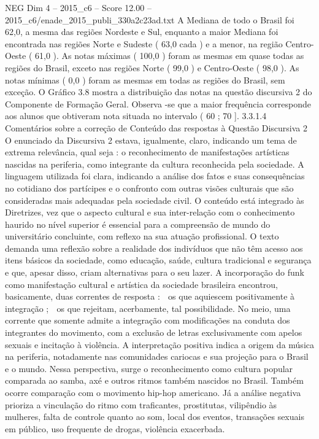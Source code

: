 \begin{textsample}{NEG Dim 4 – 2015\_c6 – Score 12.00 – 2015\_c6/enade\_2015\_publi\_330a2c23ad.txt}
A Mediana de todo o Brasil foi 62,0, a mesma das regiões Nordeste e Sul, enquanto a maior Mediana foi encontrada nas regiões Norte e Sudeste ( 63,0 cada ) e a menor, na região Centro-Oeste ( 61,0 ).
As notas máximas ( 100,0 ) foram as mesmas em quase todas as regiões do Brasil, exceto nas regiões Norte ( 99,0 ) e Centro-Oeste ( 98,0 ).
As notas mínimas ( 0,0 ) foram as mesmas em todas as regiões do Brasil, sem exceção.
O Gráfico 3.8 mostra a distribuição das notas na questão discursiva 2 do Componente de Formação Geral.
Observa -se que a maior frequência corresponde aos alunos que obtiveram nota situada no intervalo ( 60 ; 70 ]. 3.3.1.4 Comentários sobre a correção de Conteúdo das respostas à Questão Discursiva 2 O enunciado da Discursiva 2 estava, igualmente, claro, indicando um tema de extrema relevância, qual seja : o reconhecimento de manifestações artísticas nascidas na periferia, como integrante da cultura reconhecida pela sociedade.
A linguagem utilizada foi clara, indicando a análise dos fatos e suas consequências no cotidiano dos partícipes e o confronto com outras visões culturais que são consideradas mais adequadas pela sociedade civil.
O conteúdo está integrado às Diretrizes, vez que o aspecto cultural e sua inter-relação com o conhecimento haurido no nível superior é essencial para a compreensão de mundo do universitário concluinte, com reflexo na sua atuação profissional.
O texto demanda uma reflexão sobre a realidade dos indivíduos que não têm acesso aos itens básicos da sociedade, como educação, saúde, cultura tradicional e segurança e que, apesar disso, criam alternativas para o seu lazer.
A incorporação do funk como manifestação cultural e artística da sociedade brasileira encontrou, basicamente, duas correntes de resposta :  os que aquiescem positivamente à integração ;  os que rejeitam, acerbamente, tal possibilidade.
No meio, uma corrente que somente admite a integração com modificações na conduta dos integrantes do movimento, com a exclusão de letras exclusivamente com apelos sexuais e incitação à violência.
A interpretação positiva indica a origem da música na periferia, notadamente nas comunidades cariocas e sua projeção para o Brasil e o mundo.
Nessa perspectiva, surge o reconhecimento como cultura popular comparada ao samba, axé e outros ritmos também nascidos no Brasil.
Também ocorre comparação com o movimento hip-hop americano.
Já a análise negativa prioriza a vinculação do ritmo com traficantes, prostitutas, vilipêndio às mulheres, falta de controle quanto ao som, local dos eventos, transações sexuais em público, uso frequente de drogas, violência exacerbada.

\end{textsample}

